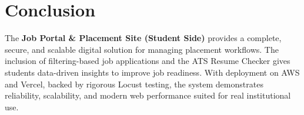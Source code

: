 \documentclass[14pt]{extarticle}
\begin{document}
\section{Conclusion}
The \textbf{Job Portal \& Placement Site (Student Side)} provides a complete, secure, and scalable digital solution for managing placement workflows.  
The inclusion of filtering-based job applications and the ATS Resume Checker gives students data-driven insights to improve job readiness.  
With deployment on AWS and Vercel, backed by rigorous Locust testing, the system demonstrates reliability, scalability, and modern web performance suited for real institutional use.
\end{document}
